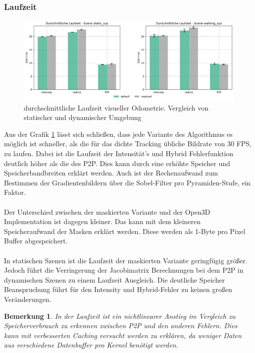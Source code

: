 \documentclass[12pt,DIV=15,BCOR=15mm,twoside,headsepline,abstract=true,listof=totoc,bibliography=totoc]{scrreprt}
\newtheorem{remark}{Bemerkung}[chapter]
\theoremstyle{remark}    %
\begin{document}
    \subsubsection{Laufzeit}
    \begin{figure}[h]
        \centering
        \includegraphics[width=\textwidth]{pics/odom_time_avg.png}
        \caption{durchschnittliche Laufzeit  visueller Odometrie. Vergleich von statischer und dynamischer Umgebung}
        \label{fig:avg_Laufzeit}
    \end{figure} \noindent
    Aus der Grafik \ref{fig:avg_Laufzeit} lässt sich schließen, dass jede Variante des Algorithmus es möglich ist schneller, als die für das dichte Tracking
    übliche Bildrate von 30 FPS, zu laufen. 
    Dabei ist die Laufzeit der Intensität's und Hybrid Fehlerfunktion deutlich höher als die des \ac{P2P}. Dies kann durch eine erhöhte Speicher und 
    Speicherbandbreiten erklärt werden. Auch ist der Rechenaufwand zum Bestimmen der Gradientenbildern über die Sobel-Filter pro Pyramiden-Stufe, ein Faktor.\\\\
    Der Unterschied zwischen der maskierten Variante und der Open3D Implementation ist dagegen kleiner. Das kann mit dem kleineren Speicheraufwand der Masken 
    erklärt werden. Diese werden als 1-Byte pro Pixel Buffer abgespeichert.\\\\
    In statischen Szenen ist die Laufzeit der maskierten Variante geringfügig größer. Jedoch führt die Verringerung der Jacobimatrix Berechnungen 
    bei dem \ac{P2P} in dynamischen Szenen zu einem Laufzeit Ausgleich. Die deutliche Speicher Beanspruchung führt für den Intensity und Hybrid-Fehler
    zu keinen großen Veränderungen.
    \begin{remark}
    In der Laufzeit ist ein nichtlinearer Anstieg im Vergleich zu Speicherverbrauch zu erkennen zwischen 
    \ac{P2P} und den anderen Fehlern. Dies kann mit verbesserten Caching versucht werden zu erklären, da weniger Daten aus
    verschiedene Datenbuffer pro Kernel benötigt werden.
    \end{remark}
    
\end{document}
